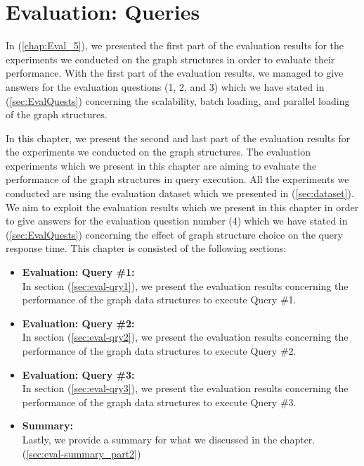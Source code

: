 {\chapter{Evaluation: Queries}
\label{chap:Eval_6}


In (\ref{chap:Eval_5}), we presented the first part of the evaluation results for the experiments we conducted on the graph structures in order to evaluate their performance. With the first part of the evaluation results, we managed to give answers for the evaluation questions (1, 2, and 3) which we have stated in (\ref{sec:EvalQuests}) concerning the scalability, batch loading, and parallel loading of the graph structures.

In this chapter, we present the second and last part of the evaluation results for the experiments we conducted on the graph structures. The evaluation experiments which we present in this chapter are aiming to evaluate the performance of the graph structures in query execution. All the experiments we conducted are using the evaluation dataset which we presented in (\ref{sec:dataset}). We aim to exploit the evaluation results which we present in this chapter in order to give answers for the evaluation question number (4) which we have stated in (\ref{sec:EvalQuests}) concerning the effect of graph structure choice on the query response time. This chapter is consisted of the following sections:

\begin{itemize}  

\item \textbf{Evaluation: Query \#1:}\\
In section (\ref{sec:eval-qry1}), we present the evaluation results concerning the performance of the graph data structures to execute Query \#1.

\item \textbf{Evaluation: Query \#2:}\\
In section (\ref{sec:eval-qry2}), we present the evaluation results concerning the performance of the graph data structures to execute Query \#2.

\item \textbf{Evaluation: Query \#3:}\\
In section (\ref{sec:eval-qry3}), we present the evaluation results concerning the performance of the graph data structures to execute Query \#3.

\item \textbf{Summary:}\\
Lastly, we provide a summary for what we discussed in the chapter. (\ref{sec:eval-summary_part2})


\end{itemize}}
